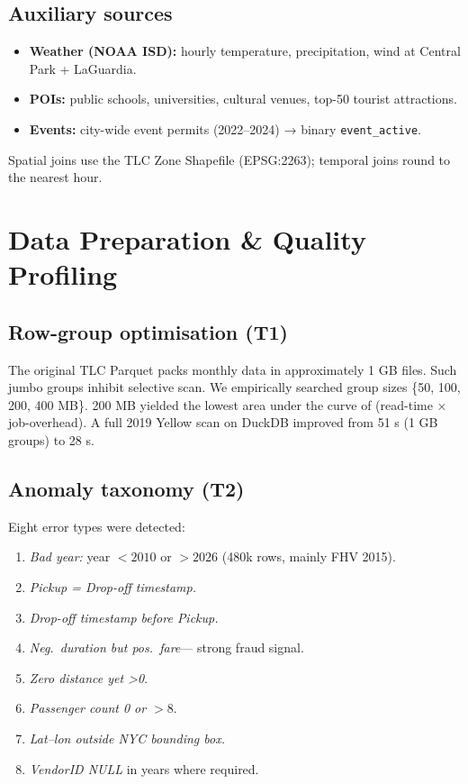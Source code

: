 \documentclass[conference]{IEEEtran}
\begin{document}
\subsection{Auxiliary sources}
\begin{itemize}
  \item \textbf{Weather (NOAA ISD):} hourly temperature, precipitation,
    wind at Central Park + LaGuardia.
  \item \textbf{POIs:} public schools, universities, cultural venues,
    top-50 tourist attractions.
  \item \textbf{Events:} city-wide event permits (2022–2024) → binary
    \texttt{event\_active}.
\end{itemize}

Spatial joins use the TLC Zone Shapefile (EPSG:2263);
temporal joins round to the nearest hour.

\section{Data Preparation \& Quality Profiling}\label{sec:prep}
\subsection{Row-group optimisation (T1)}
The original TLC Parquet
packs monthly data in approximately 1 GB files.
Such jumbo groups inhibit selective scan.
We empirically searched group sizes
\{50, 100, 200, 400 MB\}. 200 MB yielded
the lowest area under the curve of
(read-time × job-overhead). A full
2019 Yellow scan on DuckDB improved from
51 s (1 GB groups) to 28 s.

\subsection{Anomaly taxonomy (T2)}
Eight error types were detected:

\begin{enumerate}
  \item \emph{Bad year:} year $<\!2010$ or $>\!2026$
    (480k rows, mainly FHV 2015).
  \item \emph{Pickup = Drop-off timestamp.}
  \item \emph{Drop-off timestamp before Pickup.}
  \item \emph{Neg.\ duration but pos.\ fare}—
    strong fraud signal.
  \item \emph{Zero distance yet \textgreater0}.
  \item \emph{Passenger count 0 or $>\!8$}.
  \item \emph{Lat–lon outside NYC bounding box.}
  \item \emph{VendorID NULL} in years where required.
\end{enumerate}
\end{document}
